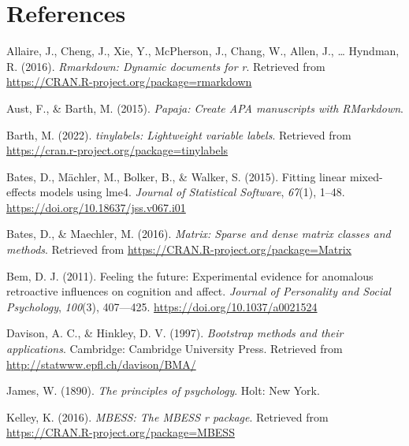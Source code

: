 \documentclass[
  man,floatsintext]{apa6}
\newlength{\cslhangindent}
\newlength{\cslentryspacingunit} %
\newenvironment{CSLReferences}[2] %
 {%
  \setlength{\parindent}{0pt}
  \ifodd #1
  \let\oldpar\par
  \def\par{\hangindent=\cslhangindent\oldpar}
  \fi
  \setlength{\parskip}{#2\cslentryspacingunit}
 }%
 {}
\begin{document}
\hypertarget{references}{%
\section{References}\label{references}}

\setlength{\parindent}{-0.5in}
\setlength{\leftskip}{0.5in}

\hypertarget{refs}{}
\begin{CSLReferences}{1}{0}
\leavevmode{}%
Allaire, J., Cheng, J., Xie, Y., McPherson, J., Chang, W., Allen, J., \ldots{} Hyndman, R. (2016). \emph{Rmarkdown: Dynamic documents for r}. Retrieved from \url{https://CRAN.R-project.org/package=rmarkdown}

\leavevmode{}%
Aust, F., \& Barth, M. (2015). \emph{Papaja: Create APA manuscripts with RMarkdown}.

\leavevmode{}%
Barth, M. (2022). \emph{{tinylabels}: Lightweight variable labels}. Retrieved from \url{https://cran.r-project.org/package=tinylabels}

\leavevmode{}%
Bates, D., Mächler, M., Bolker, B., \& Walker, S. (2015). Fitting linear mixed-effects models using {lme4}. \emph{Journal of Statistical Software}, \emph{67}(1), 1--48. \url{https://doi.org/10.18637/jss.v067.i01}

\leavevmode{}%
Bates, D., \& Maechler, M. (2016). \emph{Matrix: Sparse and dense matrix classes and methods}. Retrieved from \url{https://CRAN.R-project.org/package=Matrix}

\leavevmode{}%
Bem, D. J. (2011). Feeling the future: Experimental evidence for anomalous retroactive influences on cognition and affect. \emph{Journal of Personality and Social Psychology}, \emph{100}(3), 407---425. \url{https://doi.org/10.1037/a0021524}

\leavevmode{}%
Davison, A. C., \& Hinkley, D. V. (1997). \emph{Bootstrap methods and their applications}. Cambridge: Cambridge University Press. Retrieved from \url{http://statwww.epfl.ch/davison/BMA/}

\leavevmode{}%
James, W. (1890). \emph{The principles of psychology}. Holt: New York.

\leavevmode{}%
Kelley, K. (2016). \emph{MBESS: The MBESS r package}. Retrieved from \url{https://CRAN.R-project.org/package=MBESS}


\end{CSLReferences}
\end{document}
